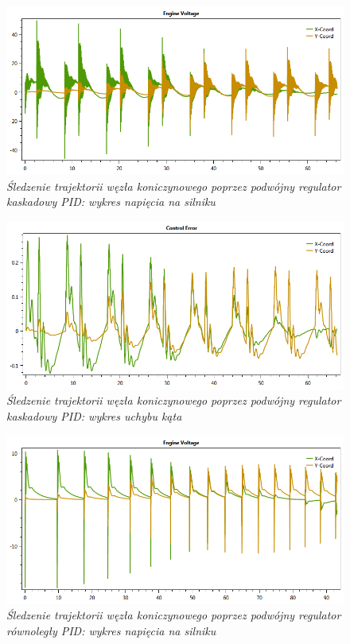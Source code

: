 \documentclass[12pt, oneside]{report}
\theoremstyle{definition}
\begin{document}

\begin{figure}[H]
	\centering
		\includegraphics[width = 320pt]{TrefoilKnotCascadeEV} 
		\caption{\textit{Śledzenie trajektorii węzła koniczynowego poprzez podwójny regulator kaskadowy PID: wykres napięcia na silniku}}
		\label{plot:TrefoilKnotCascadeEV}
\end{figure}

\begin{figure}[H]
	\centering
		\includegraphics[width = 320pt]{TrefoilKnotCascadeCE} 
		\caption{\textit{Śledzenie trajektorii węzła koniczynowego poprzez podwójny regulator kaskadowy PID: wykres uchybu kąta}}
		\label{plot:TrefoilKnotCascadeCE}
\end{figure}

\begin{figure}[H]
	\centering
		\includegraphics[width = 320pt]{TrefoilKnotParallelEV} 
		\caption{\textit{Śledzenie trajektorii węzła koniczynowego poprzez podwójny regulator równoległy PID: wykres napięcia na silniku}}
		\label{plot:TrefoilKnotParallelEV}
\end{figure}
\end{document}
